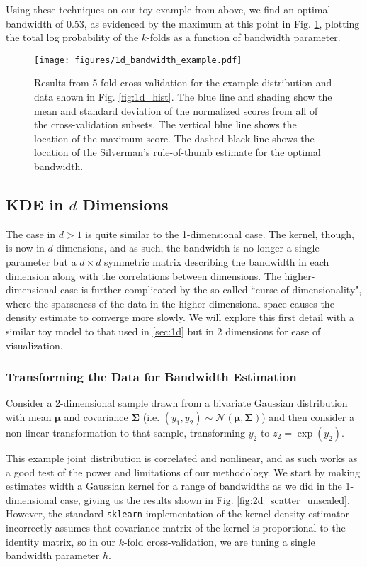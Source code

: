 Using these techniques on our toy example from above, we find an optimal bandwidth of 0.53, as evidenced by the maximum at this point in Fig. \ref{fig:1d_bandwidth_opt}, plotting the total log probability of the $k$-folds as a function of bandwidth parameter.

\begin{figure}
    \centering
    \texttt{[image: figures/1d\_bandwidth\_example.pdf]}
    \caption{Results from 5-fold cross-validation for the example distribution and data shown in Fig. \ref{fig:1d_hist}. The blue line and shading show the mean and standard deviation of the normalized scores from all of the cross-validation subsets. The vertical blue line shows the location of the maximum score. The dashed black line shows the location of the Silverman's rule-of-thumb estimate for the optimal bandwidth.}
    \label{fig:1d_bandwidth_opt}
\end{figure}

\subsection[KDE in d Dimensions]{KDE in $d$ Dimensions}
The case in $d>1$ is quite similar to the 1-dimensional case. The kernel, though, is now in $d$ dimensions, and as such, the bandwidth is no longer a single parameter but a $d\times d$ symmetric matrix describing the bandwidth in each dimension along with the correlations between dimensions. The higher-dimensional case is further complicated by the so-called ``curse of dimensionality", where the sparseness of the data in the higher dimensional space causes the density estimate to converge more slowly. We will explore this first detail with a similar toy model to that used in \ref{sec:1d} but in 2 dimensions for ease of visualization.

\subsubsection{Transforming the Data for Bandwidth Estimation}
Consider a 2-dimensional sample drawn from a bivariate Gaussian distribution with mean $\bm{\mu}$ and covariance $\bm{\Sigma}$ (i.e. $(y_1, y_2)\sim\mathcal{N}(\bm{\mu}, \bm{\Sigma})$) and then consider a non-linear transformation to that sample, transforming $y_2$ to $z_2 = \exp(y_2)$. 

This example joint distribution is correlated and nonlinear, and as such works as a good test of the power and limitations of our methodology. We start by making estimates width a Gaussian kernel for a range of bandwidths as we did in the 1-dimensional case, giving us the results shown in Fig. \ref{fig:2d_scatter_unscaled}. However, the standard \verb|sklearn| implementation of the kernel density estimator incorrectly assumes that covariance matrix of the kernel is proportional to the identity matrix, so in our $k$-fold cross-validation, we are tuning a single bandwidth parameter $h$.

